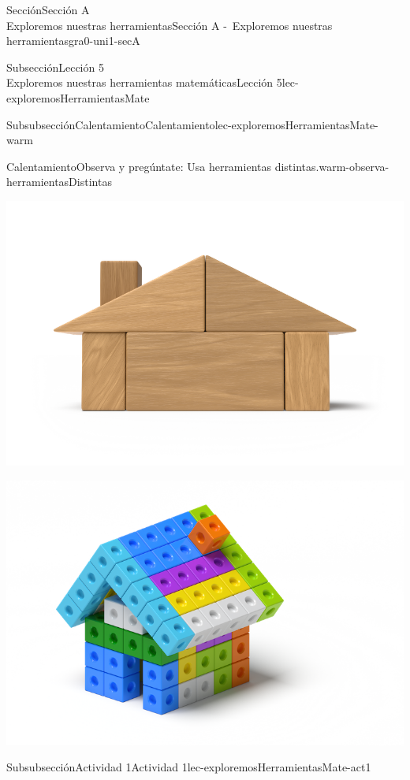 \begin{sectionptx}{Sección}{{\Large Sección A\\}Exploremos nuestras herramientas}{}{Sección A -~Exploremos nuestras herramientas}{}{}{gra0-uni1-secA}
\begin{subsectionptx}{Subsección}{{\normalsize Lección 5\\[-0.05cm]}Exploremos nuestras herramientas matemáticas}{}{Lección 5}{}{}{lec-exploremosHerramientasMate}
\begin{subsubsectionptx}{Subsubsección}{Calentamiento}{}{Calentamiento}{}{}{lec-exploremosHerramientasMate-warm}
\begin{exploration}{Calentamiento}{Observa y pregúntate: Usa herramientas distintas.}{warm-observa-herramientasDistintas}
\begin{sidebyside}{2}{0.05}{0.05}{0.1}
\begin{sbspanel}{0.4}
\includegraphics[max width=\linewidth, center]{external/png-source/K.1.A Beta Student Workbook.Woodhouse_withShadow.png}
\par
\includegraphics[max width=\linewidth, center]{external/png-source/5.1.A2.House_withShadow.png}
\end{sbspanel}%
\end{sidebyside}%
\end{exploration}%
\end{subsubsectionptx}
%
%
\typeout{************************************************}
\typeout{************************************************}
%
\begin{subsubsectionptx}{Subsubsección}{Actividad 1}{}{Actividad 1}{}{}{lec-exploremosHerramientasMate-act1}

\end{subsubsectionptx}
\end{subsectionptx}
\end{sectionptx}
